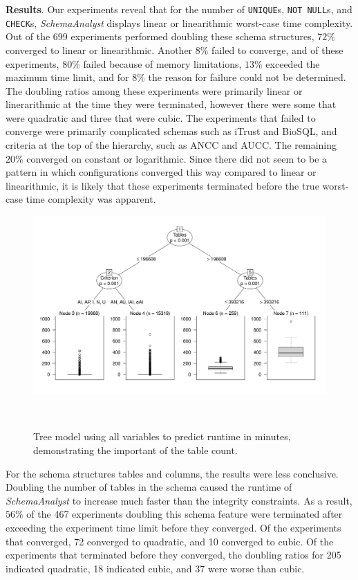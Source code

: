
\textbf{Results}. Our experiments reveal that for the number of \texttt{UNIQUE}s, {\tt NOT NULL}s, and {\tt CHECK}s,
\textit{SchemaAnalyst} displays linear or linearithmic worst-case time complexity.  Out of the 699 experiments performed
doubling these schema structures, $72\%$ converged to linear or linearithmic.  Another $8\%$ failed to converge, and of
these experiments, $80\%$ failed because of memory limitations, $13\%$ exceeded the maximum time limit, and for $8\%$
the reason for failure could not be determined.  The doubling ratios among these experiments were primarily linear or
linerarithmic at the time they were terminated, however there were some that were quadratic and three that were cubic.
The experiments that failed to converge were primarily complicated schemas such as iTrust and BioSQL, and criteria at
the top of the hierarchy, such as ANCC and AUCC. The remaining $20\%$ converged on constant or logarithmic.  Since there
did not seem to be a pattern in which configurations converged this way compared to linear or linearithmic, it is
likely that these experiments terminated before the true worst-case time complexity was apparent.

\begin{figure}[t]
\centering
  \centering
  \includegraphics[width=1.025\linewidth]{diagrams/AllTree.pdf}
  \vspace*{-.25in}
  \caption{Tree model using all variables to predict runtime in minutes, demonstrating the important of the table count.
  \vspace{-.315in}}~\label{fig:atree}
\end{figure}

For the schema structures tables and columns, the results were less conclusive. Doubling the number of tables in the
schema caused the runtime of \textit{SchemaAnalyst} to increase much faster than the integrity constraints. As a result,
$56\%$ of the 467 experiments doubling this schema feature were terminated after exceeding the experiment time limit
before they converged.  Of the experiments that converged, 72 converged to quadratic, and 10 converged to cubic.  Of the
experiments that terminated before they converged, the doubling ratios for 205 indicated quadratic, 18 indicated cubic,
and 37 were worse than cubic.

